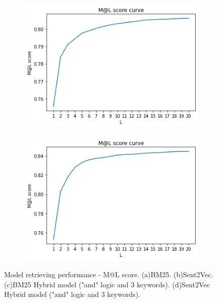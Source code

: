 \begin{figure}[htbp]
\begin{subfigure}[b]{0.48\textwidth}
		\includegraphics[width=\textwidth]{figure/partA_Bm25HybridRanker_ml_score.png}
		\caption{}
		\label{fig: Bm25HybridRanker_mlscore}
	\end{subfigure}
	\hfill
	\begin{subfigure}[b]{0.48\textwidth}
		\centering
		\includegraphics[width=\textwidth]{figure/partA_Sent2VecHybridRanker_ml_score.png}
		\caption{}
		\label{fig: Sent2VecHybridRanker_mlscore}
	\end{subfigure}
	\hfill
	\caption[]{Model retrieving performance - M@L score. (a)BM25. (b)Sent2Vec. (c)BM25 Hybrid model  ("and" logic and 3 keywords). (d)Sent2Vec Hybrid model ("and" logic and 3 keywords). }
	\label{fig: }
\end{figure}

